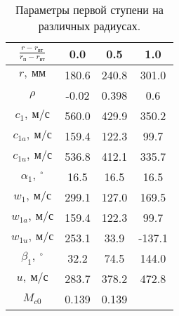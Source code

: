 \documentclass[a4paper,10pt]{article}
\begin{document}
    
    \begin{longtable}{
    |
%    
    c|
%    
    c|
%    
    c|
%    
    c|
%    
    }
        \caption{Параметры первой ступени на различных радиусах.}\\
        \hline

%        
        $\frac{r - r_{вт}}{r_{п} - r_{вт}}$
%        
        & 0.0
%        
        & 0.5
%        
        & 1.0
%        
        \\
        \hline
%        
        $r,\ мм$
%        
        & 180.6
%        
        & 240.8
%        
        & 301.0
%        
        \\
        \hline
%        
        $\rho$
%        
        & -0.02
%        
        & 0.398
%        
        & 0.6
%        
        \\
        \hline
%        
        $c_1,\ м/с$
%        
        & 560.0
%        
        & 429.9
%        
        & 350.2
%        
        \\
        \hline
%        
        $c_{1a},\ м/с$
%        
        & 159.4
%        
        & 122.3
%        
        & 99.7
%        
        \\
        \hline
%        
        $c_{1u},\ м/с$
%        
        & 536.8
%        
        & 412.1
%        
        & 335.7
%        
        \\
        \hline
%        
        $\alpha_1,\ ^\circ$
%        
        & 16.5
%        
        & 16.5
%        
        & 16.5
%        
        \\
        \hline
%        
        $w_1,\ м/с$
%        
        & 299.1
%        
        & 127.0
%        
        & 169.5
%        
        \\
        \hline
%        
        $w_{1a},\ м/с$
%        
        & 159.4
%        
        & 122.3
%        
        & 99.7
%        
        \\
        \hline
%        
        $w_{1u},\ м/с$
%        
        & 253.1
%        
        & 33.9
%        
        & -137.1
%        
        \\
        \hline
%        
        $\beta_1,\ ^\circ$
%        
        & 32.2
%        
        & 74.5
%        
        & 144.0
%        
        \\
        \hline
%        
        $u,\ м/с$
%        
        & 283.7
%        
        & 378.2
%        
        & 472.8
%        
        \\
        \hline
%        
        $M_{c0}$
%        
        & 0.139
%        
        & 0.139

\end{longtable}
\end{document}
